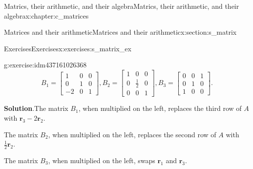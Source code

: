 \documentclass[oneside,10pt,]{book}
\newcommand{\blocktitlefont}{\relax}
\numberwithin{equation}{section}
\newcommand{\boldr}{{\mathbf r}}
\newcommand{\amp}{&}
\begin{document}
\begin{chapterptx}{Matrics, their arithmetic, and their algebra}{}{Matrics, their arithmetic, and their algebra}{}{}{x:chapter:c_matrices}
\begin{sectionptx}{Matrices and their arithmetic}{}{Matrices and their arithmetic}{}{}{x:section:s_matrix}
\begin{exercises-subsection-numberless}{Exercises}{}{Exercises}{}{}{x:exercises:s_matrix_ex}
\begin{divisionexercise}{5}{}{}{g:exercise:idm437161026368}
\begin{equation*}
B_1=\begin{bmatrix}1\amp 0\amp 0\\ 0\amp 1\amp 0\\ -2\amp 0\amp 1 \end{bmatrix} , B_2=\begin{bmatrix}1\amp 0\amp 0\\ 0\amp \frac{1}{2}\amp 0\\ 0\amp 0\amp 1 \end{bmatrix} , B_3=\begin{bmatrix}0\amp 0\amp 1\\ 0\amp 1\amp 0\\ 1\amp 0\amp 0 \end{bmatrix}\text{.}
\end{equation*}
%
\par\smallskip%
\noindent\textbf{\blocktitlefont Solution}.\hypertarget{g:solution:idm437161025984}{}\quad{}The matrix \(B_1\), when multiplied on the left, replaces the third row of \(A\) with \(\boldr_3-2\boldr_2\).%
\par
The matrix \(B_2\), when multiplied on the left, replaces the second row of \(A\) with \(\frac{1}{2}\boldr_2\).%
\par
The matrix \(B_3\), when multiplied on the left, swaps \(\boldr_1\) and \(\boldr_3\).%
\end{divisionexercise}%
\end{exercises-subsection-numberless}
\end{sectionptx}
\end{chapterptx}
\end{document}
